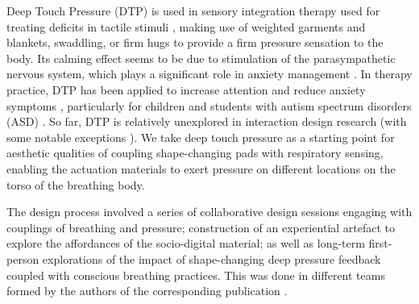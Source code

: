 Deep Touch Pressure (DTP) is used in sensory integration therapy used for treating deficits in tactile stimuli \cite{bundy_sensory_2002}, making use of weighted garments and blankets, swaddling, or firm hugs to provide a firm pressure sensation to the body. Its calming effect seems to be due to stimulation of the parasympathetic nervous system, which plays a significant role in anxiety management \cite{hsin-yung_chen_physiological_2013}. In therapy practice, DTP has been applied to increase attention \cite{fertel-daly_effects_2001} and reduce anxiety symptoms \cite{krauss_effects_1987}, particularly for children and students with autism spectrum disorders (ASD) \cite{lang_sensory_2012} \cite{alfaras_espinas_making_2021}. So far, DTP is relatively unexplored in interaction design research (with some notable exceptions \cite{delazio_force_2018, duvall_dynamic_2019, foo_user_2019, foo_soft_2020}). We take deep touch pressure as a starting point for aesthetic qualities of coupling shape-changing pads with respiratory sensing, enabling the actuation materials to exert pressure on different locations on the torso of the breathing body.

The design process involved a series of collaborative design sessions engaging with couplings of breathing and pressure; construction of an experiential artefact \cite{sundstrom_experiential_2011} to explore the affordances of the socio-digital material; as well as long-term first-person explorations of the impact of shape-changing deep pressure feedback coupled with conscious breathing practices. This was done in different teams formed by the authors of the corresponding publication \cite{jung_exploring_2021}.

